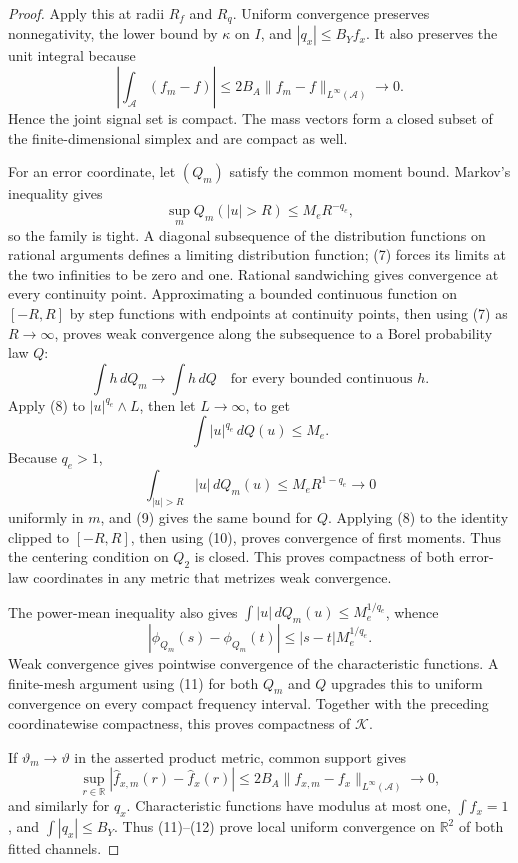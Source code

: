 \documentclass{article}
\begin{document}
\begin{proof}
Apply this at radii \(R_f\) and \(R_q\).  Uniform convergence preserves
nonnegativity, the lower bound by \(\kappa\) on \(I\), and
\(|q_x|\le B_Yf_x\).  It also preserves the unit integral because
\[
 \left|\int_{\mathcal A}(f_m-f)\right|
 \le2B_A\|f_m-f\|_{L^\infty(\mathcal A)}\longrightarrow0.        \tag{6}
\]
Hence the joint signal set is compact.  The mass vectors form a closed
subset of the finite-dimensional simplex and are compact as well.

For an error coordinate, let \((Q_m)\) satisfy the common moment bound.
Markov's inequality gives
\[
 \sup_mQ_m(|u|>R)\le M_eR^{-q_e},                                 \tag{7}
\]
so the family is tight.  A diagonal subsequence of the distribution
functions on rational arguments defines a limiting distribution function;
(7) forces its limits at the two infinities to be zero and one.  Rational
sandwiching gives convergence at every continuity point.  Approximating a
bounded continuous function on \([-R,R]\) by step functions with endpoints
at continuity points, then using (7) as \(R\to\infty\), proves weak
convergence along the subsequence to a Borel probability law \(Q\):
\[
 \int h\,dQ_m\longrightarrow\int h\,dQ
 \quad\text{for every bounded continuous }h.                     \tag{8}
\]
Apply (8) to \(|u|^{q_e}\wedge L\), then let \(L\to\infty\), to get
\[
 \int|u|^{q_e}\,dQ(u)\le M_e.                                   \tag{9}
\]
Because \(q_e>1\),
\[
 \int_{|u|>R}|u|\,dQ_m(u)
 \le M_eR^{1-q_e}\longrightarrow0                               \tag{10}
\]
uniformly in \(m\), and (9) gives the same bound for \(Q\).  Applying (8)
to the identity clipped to \([-R,R]\), then using (10), proves convergence
of first moments.  Thus the centering condition on \(Q_2\) is closed.  This
proves compactness of both error-law coordinates in any metric that
metrizes weak convergence.

The power-mean inequality also gives
\(\int|u|\,dQ_m(u)\le M_e^{1/q_e}\), whence
\[
 |\phi_{Q_m}(s)-\phi_{Q_m}(t)|
 \le |s-t|M_e^{1/q_e}.                                           \tag{11}
\]
Weak convergence gives pointwise convergence of the characteristic
functions.  A finite-mesh argument using (11) for both \(Q_m\) and \(Q\)
upgrades this to uniform convergence on every compact frequency interval.
Together with the preceding coordinatewise compactness, this proves
compactness of \(\mathscr K\).

If \(\vartheta_m\to\vartheta\) in the asserted product metric, common
support gives
\[
 \sup_{r\in\mathbb R}|\widehat f_{x,m}(r)-\widehat f_x(r)|
 \le2B_A\|f_{x,m}-f_x\|_{L^\infty(\mathcal A)}\longrightarrow0, \tag{12}
\]
and similarly for \(q_x\).  Characteristic functions have modulus at most
one, \(\int f_x=1\), and \(\int|q_x|\le B_Y\).  Thus (11)--(12) prove local
uniform convergence on \(\mathbb R^2\) of both fitted channels.


\end{proof}
\end{document}

